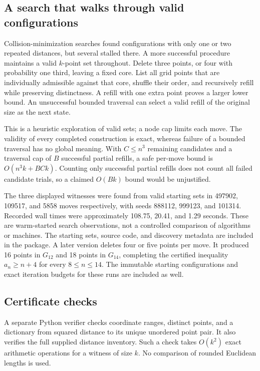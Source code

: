 \subsection{A search that walks through valid configurations}
Collision-minimization searches found configurations with only one or
two repeated distances, but several stalled there. A more successful
procedure maintains a valid \(k\)-point set throughout. Delete three
points, or four with probability one third, leaving a fixed core. List
all grid points that are individually admissible against that core,
shuffle their order, and recursively refill while preserving distinctness.
A refill with one extra point proves a larger lower bound. An unsuccessful
bounded traversal can select a valid refill of the original size as the
next state.

This is a heuristic exploration of valid sets; a node cap limits each
move. The validity of every completed construction is exact, whereas
failure of a bounded traversal has no global meaning. With \(C\le n^3\)
remaining candidates and a traversal cap of \(B\) successful partial
refills, a safe per-move bound is \(O(n^3k+BCk)\). Counting only successful
partial refills does not count all failed candidate trials, so a claimed
\(O(Bk)\) bound would be unjustified.

The three displayed witnesses were found from valid starting sets in
497902, 109517, and 5858 moves respectively, with seeds 888112, 999123,
and 101314. Recorded wall times were approximately 108.75, 20.41,
and 1.29 seconds. These are warm-started search observations, not a
controlled comparison of algorithms or machines. The starting sets,
source code, and discovery metadata are included in the package.
A later version deletes four or five points per move. It produced
16 points in \(G_{12}\) and 18 points in \(G_{14}\), completing the
certified inequality \(a_n\ge n+4\) for every \(8\le n\le14\).
The immutable starting configurations and exact iteration budgets
for these runs are included as well.

\subsection{Certificate checks}
A separate Python verifier checks coordinate ranges, distinct points,
and a dictionary from squared distance to its unique unordered point
pair. It also verifies the full supplied distance inventory. Such a
check takes \(O(k^2)\) exact arithmetic operations for a witness of
size \(k\). No comparison of rounded Euclidean lengths is used.


